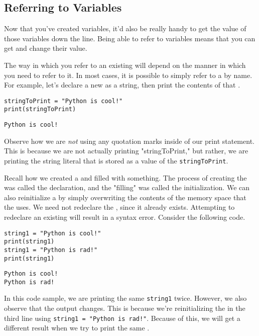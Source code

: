 \subsection{Referring to Variables}
Now that you've created variables, it'd also be really handy to get the value of those variables down the line. Being able to refer to variables means that you can get and change their value.\par
The way in which you refer to an existing  will depend on the manner in which you need to refer to it. In most cases, it is possible to simply refer to a  by name. For example, let's declare a new  as a string, then print the contents of that .
\begin{lstlisting}[style=pippython]
stringToPrint = "Python is cool!"
print(stringToPrint)
\end{lstlisting}
\begin{lstlisting}
Python is cool!
\end{lstlisting}
Observe how we are \textit{not} using any quotation marks inside of our print statement. This is because we are not actually printing "stringToPrint," but rather, we are printing the string literal that is stored as a value of the  \verb|stringToPrint|.\par
Recall how we created a  and filled with something. The process of creating the  was called the declaration, and the "filling" was called the initialization. We can also reinitialize a  by simply overwriting the contents of the memory space that the  uses. We need not redeclare the , since it already exists. Attempting to redeclare an existing  will result in a syntax error. Consider the following code.\par
\begin{lstlisting}[style=pippython]
string1 = "Python is cool!"
print(string1)
string1 = "Python is rad!"
print(string1)
\end{lstlisting}
\begin{lstlisting}
Python is cool!
Python is rad!
\end{lstlisting}
In this code sample, we are printing the same  \verb|string1| twice. However, we also observe that the output changes. This is because we're reinitializing the  in the third line using \verb|string1 = "Python is rad!"|. Because of this, we will get a different result when we try to print the same .\par

